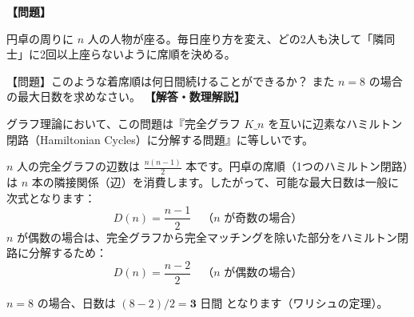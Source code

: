 \documentclass[10pt,a4paper,oneside,openany]{ltjsbook}
\begin{document}
\begin{tcolorbox}[colback=softblue,colframe=primaryblue,title=\textbf{第 273 問：円卓の着席順（ハミルトン閉路の素分割） （原題: THE ROUND TABLE.）},arc=2mm,boxrule=1pt,breakable]
\textbf{【問題】}\par\vspace{0.3em}
円卓の周りに $n$ 人の人物が座る。毎日座り方を変え、どの2人も決して「隣同士」に2回以上座らないように席順を決める。

【問題】このような着席順は何日間続けることができるか？ また $n=8$ の場合の最大日数を求めなさい。
\tcblower
\textbf{【解答・数理解説】}\par\vspace{0.3em}
グラフ理論において、この問題は『完全グラフ $K\_n$ を互いに辺素なハミルトン閉路（Hamiltonian Cycles）に分解する問題』に等しいです。

$n$ 人の完全グラフの辺数は $\frac{n(n-1)}{2}$ 本です。円卓の席順（1つのハミルトン閉路）は $n$ 本の隣接関係（辺）を消費します。したがって、可能な最大日数は一般に次式となります：
\[ D(n) = \frac{n - 1}{2} \quad \text{（$n$ が奇数の場合）} \]
$n$ が偶数の場合は、完全グラフから完全マッチングを除いた部分をハミルトン閉路に分解するため：
\[ D(n) = \frac{n - 2}{2} \quad \text{（$n$ が偶数の場合）} \]

$n=8$ の場合、日数は $(8 - 2)/2 = \mathbf{3 \text{ 日間}}$ となります（ワリシュの定理）。
\end{tcolorbox}
\end{document}
